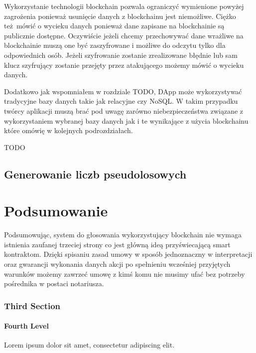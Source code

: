 \documentclass[]{llncs}
\begin{document}
  Wykorzystanie technologii blockchain pozwala ograniczyć wymienione powyżej
  zagrożenia ponieważ usunięcie danych z blockchainu jest niemożliwe. Ciężko
  też mówić o wycieku danych ponieważ dane zapisane na blockchainie są
  publicznie dostępne. Oczywiście jeżeli chcemy przechowywać dane wrażliwe na
  blockchainie muszą one być zaszyfrowane i możliwe do odczytu tylko dla
  odpowiednich osób. Jeżeli szyfrowanie zostanie zrealizowane błędnie lub sam
  klucz szyfrujący zostanie przejęty przez atakującego możemy mówić o wycieku
  danych.

  Dodatkowo jak wspomniałem w rozdziale TODO, DApp może wykorzystywać tradycyjne
  bazy danych takie jak relacyjne czy NoSQL. W takim przypadku twórcy aplikacji
  muszą brać pod uwagę zarówno niebezpieczeństwa związane z wykorzystaniem
  wybranej bazy danych jak i te wynikające z użycia blockchainu które omówię w
  kolejnych podrozdziałach.

  TODO
  \cite{open-zeppelin}

\subsection{Generowanie liczb pseudolosowych}

\cite{liczby-losowe}

\section{Podsumowanie}

  Podsumowując, system do głosowania wykorzystujący blockchain nie wymaga
  istnienia zaufanej trzeciej strony co jest główną ideą przyświecającą smart
  kontraktom. Dzięki spisaniu zasad umowy w sposób jednoznaczny w interpretacji
  oraz gwarancji wykonania danych akcji po spełnieniu wcześniej przyjętych
  warunków możemy zawrzeć umowę z kimś komu nie musimy ufać bez potrzeby
  pośrednika w postaci notariusza.


\subsubsection{Third Section}
\paragraph{Fourth Level}
Lorem ipsum dolor sit amet, consectetur adipiscing elit.
\end{document}
